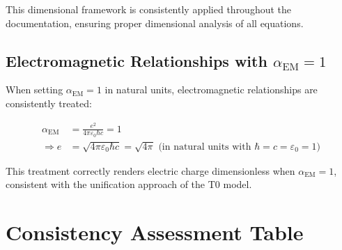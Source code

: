 \documentclass[a4paper,11pt]{article}
\newcommand{\alphaEM}{\alpha_{\text{EM}}}
\begin{document}
	This dimensional framework is consistently applied throughout the documentation, ensuring proper dimensional analysis of all equations.
	
	\subsection{Electromagnetic Relationships with $\alphaEM = 1$}
	
	When setting $\alphaEM = 1$ in natural units, electromagnetic relationships are consistently treated:
	
	\begin{tcolorbox}[colback=blue!5!white, colframe=blue!75!black, title={Electromagnetic Relationships with $\alphaEM = 1$}]
		\begin{align}
			\alphaEM &= \frac{e^2}{4\pi\varepsilon_0 \hbar c} = 1 \\
			\Rightarrow e &= \sqrt{4\pi\varepsilon_0 \hbar c} = \sqrt{4\pi} \text{ (in natural units with $\hbar = c = \varepsilon_0 = 1$)}
		\end{align}
	\end{tcolorbox}
	
	This treatment correctly renders electric charge dimensionless when $\alphaEM = 1$, consistent with the unification approach of the T0 model.
	
	\section{Consistency Assessment Table}
	
\end{document}
